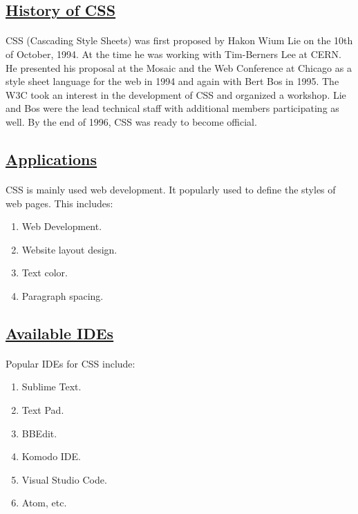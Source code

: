 \documentclass[12pt]{article}
\begin{document}
            \subsection*{\Large \underline{History of CSS}}
                   \paragraph{}
                       CSS (Cascading Style Sheets) was first proposed by Hakon Wium Lie on the 10th of October, 1994. At the time he was working with Tim-Berners Lee at CERN. He presented his proposal at the Mosaic and the Web Conference at Chicago as a style sheet language for the web in 1994 and again with Bert Bos in 1995. The W3C took an interest in the development of CSS and organized a workshop. Lie and Bos were the lead technical staff with additional members participating as well. By the end of 1996, CSS was ready to become official.                                     
            \subsection*{\underline{Applications}}
                   \paragraph{}
                   CSS is mainly used web development. It popularly used to define the styles of web pages. This includes:                   
                   \begin{enumerate}
                   	   \item Web Development.
                   	   \item Website layout design.
                   	   \item Text color.
                   	   \item Paragraph spacing.
                   \end{enumerate}               
               \subsection*{\underline{Available IDEs}}
                      \paragraph{}
                      Popular IDEs for CSS include:                      
                      \begin{enumerate}
                      	\item Sublime Text.
                      	\item Text Pad.
                      	\item BBEdit.
                      	\item Komodo IDE.
                      	\item Visual Studio Code.
                      	\item Atom, etc.
                      \end{enumerate}               
\end{document}
